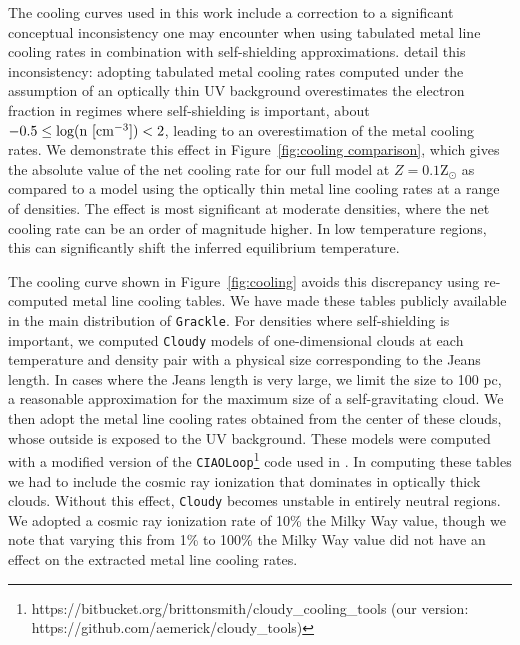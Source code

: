 \documentclass[twocolumn]{aastex61}
\begin{document}
The cooling curves used in this work include a correction to a significant conceptual inconsistency one may encounter when using tabulated metal line cooling rates in combination with self-shielding approximations. \citet{Hu2017} detail this inconsistency: adopting tabulated metal cooling rates computed under the assumption of an optically thin UV background overestimates the electron fraction in regimes where self-shielding is important, about $-0.5 \leq \rm{log(n~[cm^{-3}])} < 2$, leading to an overestimation of the metal cooling rates. We demonstrate this effect in Figure~\ref{fig:cooling comparison}, which gives the absolute value of the net cooling rate
for our full model at $Z = 0.1$Z$_{\odot}$ as compared to a model using the optically thin metal line cooling rates at a range of densities. The effect is most significant at moderate densities, where the net cooling rate can be an order of magnitude higher. In low temperature regions, this can significantly shift the inferred equilibrium temperature.

The cooling curve shown in Figure~\ref{fig:cooling} avoids this discrepancy using re-computed metal line cooling tables. We have made these tables publicly available in the main distribution of \texttt{Grackle}. For densities where self-shielding is important, we computed \texttt{Cloudy} models of one-dimensional clouds at each temperature and density pair with a physical size corresponding to the Jeans length. In cases where the Jeans length is very large, we limit the size to 100 pc, a reasonable approximation for the maximum size of a self-gravitating cloud. We then adopt the metal line cooling rates obtained from the center of these clouds, whose outside is exposed to the UV background. These models were computed with a modified version of the \texttt{CIAOLoop}\footnote{https://bitbucket.org/brittonsmith/cloudy\_cooling\_tools (our version: https://github.com/aemerick/cloudy\_tools)} code used in \citet{2008MNRAS.385.1443S}. In computing these tables we had to include the cosmic ray ionization that dominates in optically thick clouds. Without this effect, \texttt{Cloudy} becomes unstable in entirely neutral regions. We adopted a cosmic ray ionization rate of 10\% the Milky Way value, though we note that varying this from 1\% to 100\% the Milky Way value did not have an effect on the extracted metal line cooling rates. 
\end{document}
